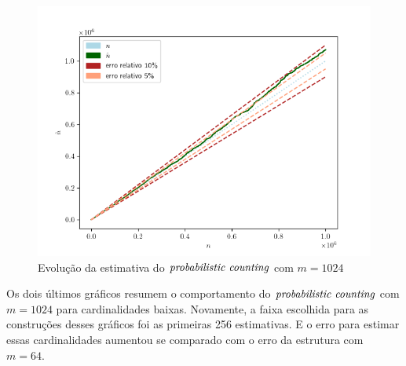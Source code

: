 \begin{figure}
  \centering
  \includegraphics[scale=0.50]{figuras/pcounting-estimate-1024.png}
	\caption{Evolução da estimativa do $\textit{probabilistic counting}$ com $m = 1024$}
\end{figure}

\newpage

Os dois últimos gráficos resumem o comportamento do $\textit{probabilistic counting}$ com $m = 1024$ para cardinalidades baixas. Novamente, a
faixa escolhida para as construções desses gráficos foi as primeiras 256 estimativas. E o erro para estimar essas 
cardinalidades aumentou se comparado com o erro da estrutura com $m = 64$.

\begin{figure}
  \centering
  \qquad
\end{figure}


